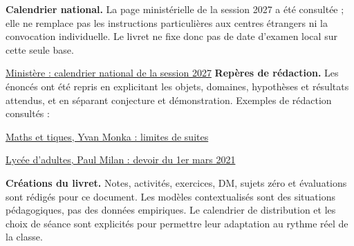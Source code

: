 \textbf{Calendrier national.} La page ministérielle de la session 2027 a été consultée ; elle ne remplace pas les instructions particulières aux centres étrangers ni la convocation individuelle. Le livret ne fixe donc pas de date d'examen local sur cette seule base.\par
\href{https://www.education.gouv.fr/reussir-au-lycee/baccalaureat-brevet-cap-le-calendrier-2027-341384}{Ministère : calendrier national de la session 2027}
\textbf{Repères de rédaction.} Les énoncés ont été repris en explicitant les objets, domaines, hypothèses et résultats attendus, et en séparant conjecture et démonstration. Exemples de rédaction consultés :\par
\href{https://www.maths-et-tiques.fr/telech/20SuitesTS2.pdf}{Maths et tiques, Yvan Monka : limites de suites}\par
\href{https://www.lyceedadultes.fr/sitepedagogique/documents/math/mathTermSpe/ctrle_2020_2021/13_devoir_01_03_2021.pdf}{Lycée d'adultes, Paul Milan : devoir du 1er mars 2021}\par
\textbf{Créations du livret.} Notes, activités, exercices, DM, sujets zéro et évaluations sont rédigés pour ce document. Les modèles contextualisés sont des situations pédagogiques, pas des données empiriques. Le calendrier de distribution et les choix de séance sont explicités pour permettre leur adaptation au rythme réel de la classe.



